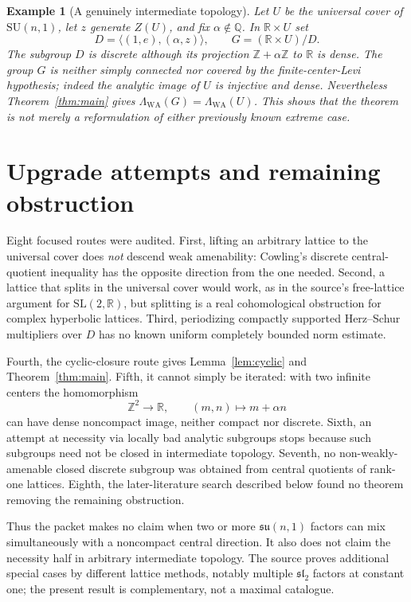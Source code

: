 \documentclass[11pt]{article}
\newtheorem{example}[theorem]{Example}
\newcommand{\WA}{\mathrm{WA}}
\begin{document}
\begin{example}[A genuinely intermediate topology]\label{ex:irrational}
Let $U$ be the universal cover of $\mathrm{SU}(n,1)$, let $z$ generate
$Z(U)$, and fix $\alpha\notin\mathbb Q$.  In $\mathbb R\times U$ set
\[
 D=\langle(1,e),(\alpha,z)\rangle,
 \qquad G=(\mathbb R\times U)/D.
\]
The subgroup $D$ is discrete although its projection
$\mathbb Z+\alpha\mathbb Z$ to $\mathbb R$ is dense.  The group $G$ is
neither simply connected nor covered by the finite-center-Levi hypothesis;
indeed the analytic image of $U$ is injective and dense.  Nevertheless
Theorem~\ref{thm:main} gives
$\Lambda_{\WA}(G)=\Lambda_{\WA}(U)$.  This shows that the theorem is not
merely a reformulation of either previously known extreme case.
\end{example}

\section{Upgrade attempts and remaining obstruction}

Eight focused routes were audited.  First, lifting an arbitrary lattice to
the universal cover does \emph{not} descend weak amenability: Cowling's
discrete central-quotient inequality has the opposite direction from the
one needed.  Second, a lattice that splits in the universal cover would
work, as in the source's free-lattice argument for $\mathrm{SL}(2,\mathbb
R)$, but splitting is a real cohomological obstruction for complex
hyperbolic lattices.  Third, periodizing compactly supported Herz--Schur
multipliers over $D$ has no known uniform completely bounded norm estimate.

Fourth, the cyclic-closure route gives Lemma~\ref{lem:cyclic} and
Theorem~\ref{thm:main}.  Fifth, it cannot simply be iterated: with two
infinite centers the homomorphism
\[
 \mathbb Z^2\longrightarrow\mathbb R,
 \qquad(m,n)\longmapsto m+\alpha n
\]
can have dense noncompact image, neither compact nor discrete.  Sixth, an
attempt at necessity via locally bad analytic subgroups stops because such
subgroups need not be closed in intermediate topology.  Seventh, no
non-weakly-amenable closed discrete subgroup was obtained from central
quotients of rank-one lattices.  Eighth, the later-literature search
described below found no theorem removing the remaining obstruction.

Thus the packet makes no claim when two or more
$\mathfrak{su}(n,1)$ factors can mix simultaneously with a noncompact
central direction.  It also does not claim the necessity half in arbitrary
intermediate topology.  The source proves additional special cases by
different lattice methods, notably multiple $\mathfrak{sl}_2$ factors at
constant one; the present result is complementary, not a maximal catalogue.
\end{document}
